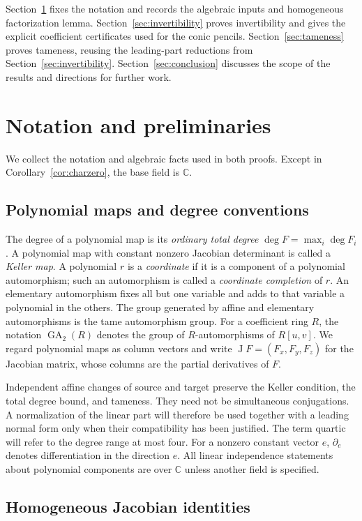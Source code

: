 \documentclass[11pt,reqno]{amsart}
\numberwithin{equation}{section}
\theoremstyle{plain}
\theoremstyle{definition}
\theoremstyle{remark}
\newcommand{\C}{\mathbb C}
\newcommand{\GA}{\operatorname{GA}}
\newcommand{\J}{\operatorname J}
\begin{document}
Section~\ref{sec:preliminaries} fixes the notation and records the
algebraic inputs and homogeneous factorization lemma.
Section~\ref{sec:invertibility} proves invertibility and gives the explicit
coefficient certificates used for the conic pencils.
Section~\ref{sec:tameness} proves tameness, reusing the leading-part
reductions from Section~\ref{sec:invertibility}.
Section~\ref{sec:conclusion} discusses the scope of the results and
directions for further work.

\section{Notation and preliminaries}\label{sec:preliminaries}
We collect the notation and algebraic facts used in both proofs. Except in
Corollary~\ref{cor:charzero}, the base field is $\C$.

\subsection{Polynomial maps and degree conventions}
The degree of a polynomial map is its \emph{ordinary total degree}
$\deg F=\max_i\deg F_i$.
A polynomial map with constant nonzero Jacobian determinant is called a
\emph{Keller map}. A polynomial $r$ is a \emph{coordinate} if it is a
component of a polynomial automorphism; such an automorphism is called a
\emph{coordinate completion} of $r$. An elementary automorphism fixes all
but one variable and adds to that variable a polynomial in the others.
The group generated by affine and elementary automorphisms is the tame
automorphism group. For a coefficient ring $R$, the notation $\GA_2(R)$
denotes the group of $R$-automorphisms of $R[u,v]$.
We regard polynomial maps as column vectors and write
$\J F=(F_x,F_y,F_z)$ for the Jacobian matrix, whose columns are the
partial derivatives of $F$.

Independent affine changes of source and target preserve the Keller
condition, the total degree bound, and tameness. They need not be simultaneous
conjugations. A normalization of the linear part will therefore be used
together with a leading normal form only when their compatibility has been
justified. The term quartic will refer to the degree range at most four.
For a nonzero constant vector $e$, $\partial_e$ denotes differentiation in
the direction $e$. All linear independence statements about polynomial
components are over $\C$ unless another field is specified.

\subsection{Homogeneous Jacobian identities}
\end{document}
